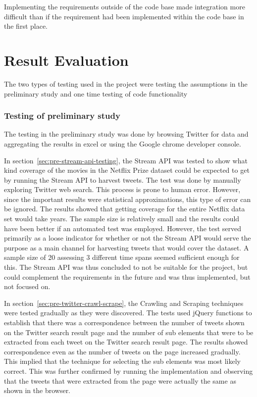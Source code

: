 Implementing the requirements outside of the code base made integration more difficult than if the requirement had been implemented within the code base in the first place.

\section{Result Evaluation}
The two types of testing used in the project were testing the assumptions in the preliminary study and one time testing of code functionality

\subsubsection{Testing of preliminary study}
The testing in the preliminary study was done by browsing Twitter for data and aggregating the results in excel or using the Google chrome developer console.

In section~\ref{sec:pre-stream-api-testing}, the Stream API was tested to show what kind coverage of the movies in the Netflix Prize dataset could be expected to get by running the Stream API to harvest tweets. The test was done by manually exploring Twitter web search. This process is prone to human error. However, since the important results were statistical approximations, this type of error can be ignored. The results showed that getting coverage for the entire Netflix data set would take years. The sample size is relatively small and the results could have been better if an automated test was employed. However, the test served primarily as a loose indicator for whether or not the Stream API would serve the purpose as a main channel for harvesting tweets that would cover the dataset. A sample size of 20 assessing 3 different
time spans seemed sufficient enough for this. The Stream API was thus concluded to not be suitable for the project, but could complement the requirements in the future and was thus implemented, but not focused on.

In section~\ref{sec:pre-twitter-crawl-scrape}, the Crawling and Scraping techniques were tested gradually as they were discovered. The tests used jQuery functions to establish that there was a correspondence between the number of tweets shown on the Twitter search result page and the number of sub elements that were to be extracted from each tweet on the Twitter search result page. The results showed correspondence even as the number of tweets on the page increased gradually. This implied that the technique for selecting the sub elements was most likely correct. This was further confirmed by running the implementation and observing that the tweets that were extracted from the page were actually the same as shown in the browser.

